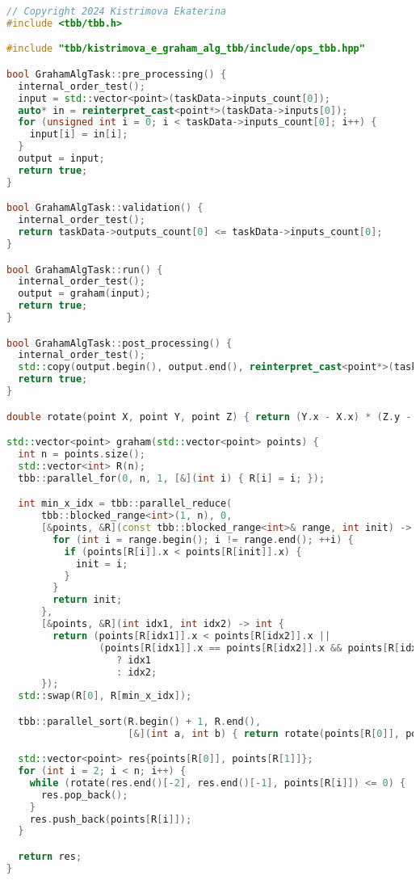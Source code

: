 \documentclass{report}
\begin{document}
\begin{lstlisting}[language=C++,caption=TBB версия]
// Copyright 2024 Kistrimova Ekaterina
#include <tbb/tbb.h>

#include "tbb/kistrimova_e_graham_alg_tbb/include/ops_tbb.hpp"

bool GrahamAlgTask::pre_processing() {
  internal_order_test();
  input = std::vector<point>(taskData->inputs_count[0]);
  auto* in = reinterpret_cast<point*>(taskData->inputs[0]);
  for (unsigned int i = 0; i < taskData->inputs_count[0]; i++) {
    input[i] = in[i];
  }
  output = input;
  return true;
}

bool GrahamAlgTask::validation() {
  internal_order_test();
  return taskData->outputs_count[0] <= taskData->inputs_count[0];
}

bool GrahamAlgTask::run() {
  internal_order_test();
  output = graham(input);
  return true;
}

bool GrahamAlgTask::post_processing() {
  internal_order_test();
  std::copy(output.begin(), output.end(), reinterpret_cast<point*>(taskData->outputs[0]));
  return true;
}

double rotate(point X, point Y, point Z) { return (Y.x - X.x) * (Z.y - Y.y) - (Y.y - X.y) * (Z.x - Y.x); }

std::vector<point> graham(std::vector<point> points) {
  int n = points.size();
  std::vector<int> R(n);
  tbb::parallel_for(0, n, 1, [&](int i) { R[i] = i; });

  int min_x_idx = tbb::parallel_reduce(
      tbb::blocked_range<int>(1, n), 0,
      [&points, &R](const tbb::blocked_range<int>& range, int init) -> int {
        for (int i = range.begin(); i != range.end(); ++i) {
          if (points[R[i]].x < points[R[init]].x) {
            init = i;
          }
        }
        return init;
      },
      [&points, &R](int idx1, int idx2) -> int {
        return (points[R[idx1]].x < points[R[idx2]].x ||
                (points[R[idx1]].x == points[R[idx2]].x && points[R[idx1]].y < points[R[idx2]].y))
                   ? idx1
                   : idx2;
      });
  std::swap(R[0], R[min_x_idx]);

  tbb::parallel_sort(R.begin() + 1, R.end(),
                     [&](int a, int b) { return rotate(points[R[0]], points[a], points[b]) > 0; });

  std::vector<point> res{points[R[0]], points[R[1]]};
  for (int i = 2; i < n; i++) {
    while (rotate(res.end()[-2], res.end()[-1], points[R[i]]) <= 0) {
      res.pop_back();
    }
    res.push_back(points[R[i]]);
  }

  return res;
}
\end{lstlisting}
\end{document}
